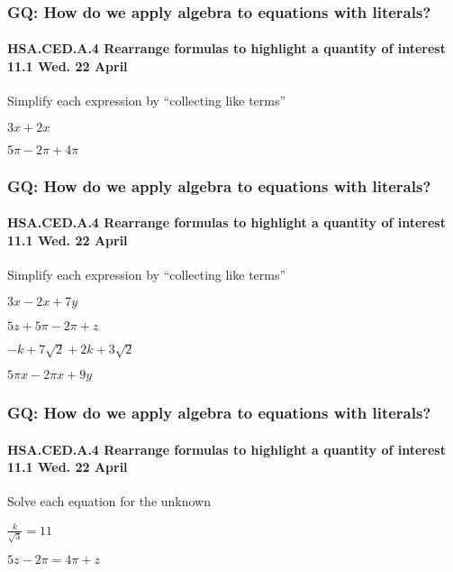 \documentclass{beamer}
\begin{document}
\frame
{
  \frametitle{GQ: How do we apply algebra to equations with literals?}
  \framesubtitle{HSA.CED.A.4 Rearrange formulas to highlight a quantity of interest \hfill \alert{11.1 Wed. 22 April}}

  \Large{
  Simplify each expression by ``collecting like terms''
  
  \begin{enumerate}
    \begin{multicols}{2}
      \item $3x+2x$ \vspace{2cm}
      \item $5\pi-2\pi+4\pi$
    \end{multicols}
    \end{enumerate} \vspace{5cm}
}
}

\frame
{
  \frametitle{GQ: How do we apply algebra to equations with literals?}
  \framesubtitle{HSA.CED.A.4 Rearrange formulas to highlight a quantity of interest \hfill \alert{11.1 Wed. 22 April}}

  Simplify each expression by ``collecting like terms''
\Large{  
  \begin{enumerate}%
    \begin{multicols}{2}
      \item $3x-2x+7y$ \vspace{2cm}
      \item $5z+5\pi-2\pi+z$
      \item $-k+7\sqrt{2}+2k+3\sqrt{2}$ \vspace{2cm}
      \item $5\pi x-2 \pi x +9y$
    \end{multicols}
    \end{enumerate} \vspace{2cm}
}}


\frame
{
  \frametitle{GQ: How do we apply algebra to equations with literals?}
  \framesubtitle{HSA.CED.A.4 Rearrange formulas to highlight a quantity of interest \hfill \alert{11.1 Wed. 22 April}}
  \Large{
  Solve each equation for the unknown
  
  \begin{enumerate}
    \begin{multicols}{2}
      \item $\displaystyle \frac{k}{\sqrt{3}}=11$
      \item $5z-2 \pi = 4\pi +z$
    \end{multicols}
    \end{enumerate} \vspace{7cm}
}}
\end{document}
